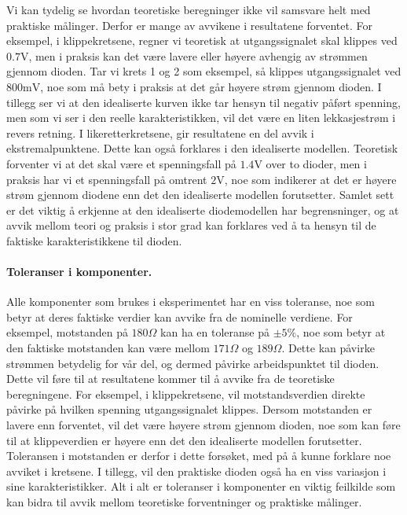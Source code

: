 \noindent
Vi kan tydelig se hvordan teoretiske beregninger ikke vil samsvare helt med praktiske målinger. Derfor er mange av avvikene i resultatene forventet. For eksempel, i klippekretsene, regner vi teoretisk at utgangssignalet skal klippes ved $0.7\text{V}$, men i praksis kan det være lavere eller høyere avhengig av strømmen gjennom dioden. Tar vi krets 1 og 2 som eksempel, så klippes utgangssignalet ved $800\text{mV}$, noe som må bety i praksis at det går høyere strøm gjennom dioden. I tillegg ser vi at den idealiserte kurven ikke tar hensyn til negativ påført spenning, men som vi ser i den reelle karakteristikken, vil det være en liten lekkasjestrøm i revers retning. I likeretterkretsene, gir resultatene en del avvik i ekstremalpunktene. Dette kan også forklares i den idealiserte modellen. Teoretisk forventer vi at det skal være et spenningsfall på $1.4\text{V}$ over to dioder, men i praksis har vi et spenningsfall på omtrent $2\text{V}$, noe som indikerer at det er høyere strøm gjennom diodene enn det den idealiserte modellen forutsetter. Samlet sett er det viktig å erkjenne at den idealiserte diodemodellen har begrensninger, og at avvik mellom teori og praksis i stor grad kan forklares ved å ta hensyn til de faktiske karakteristikkene til dioden.

\paragraph{Toleranser i komponenter. } Alle komponenter som brukes i eksperimentet har en viss toleranse, noe som betyr at deres faktiske verdier kan avvike fra de nominelle verdiene. For eksempel, motstanden på $180\Omega$ kan ha en toleranse på $\pm 5\%$, noe som betyr at den faktiske motstanden kan være mellom $171\Omega$ og $189\Omega$. Dette kan påvirke strømmen betydelig for vår del, og dermed påvirke arbeidspunktet til dioden. Dette vil føre til at resultatene kommer til å avvike fra de teoretiske beregningene. For eksempel, i klippekretsene, vil motstandsverdien direkte påvirke på hvilken spenning utgangssignalet klippes. Dersom motstanden er lavere enn forventet, vil det være høyere strøm gjennom dioden, noe som kan føre til at klippeverdien er høyere enn det den idealiserte modellen forutsetter. Toleransen i motstanden er derfor i dette forsøket, med på å kunne forklare noe avviket i kretsene. I tillegg, vil den praktiske dioden også ha en viss variasjon i sine karakteristikker. Alt i alt er toleranser i komponenter en viktig feilkilde som kan bidra til avvik mellom teoretiske forventninger og praktiske målinger.

